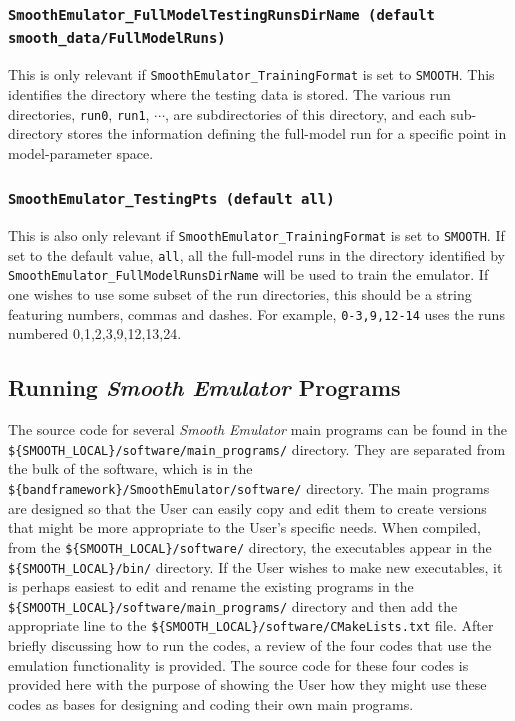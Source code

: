 \documentclass[UserManual.tex]{subfiles}
\begin{document}
\begin{sloppypar}
\subsubsection{{\tt SmoothEmulator\_FullModelTestingRunsDirName (default smooth\_data/FullModelRuns)}}
This is only relevant if {\tt SmoothEmulator\_TrainingFormat} is set to {\tt SMOOTH}. This identifies the directory where the testing data is stored. The various run directories, {\tt run0}, {\tt run1}, $\cdots$, are subdirectories of this directory, and each sub-directory stores the information defining the full-model run for a specific point in model-parameter space.

\subsubsection{{\tt SmoothEmulator\_TestingPts (default all)}}
This is also only relevant if {\tt SmoothEmulator\_TrainingFormat} is set to {\tt SMOOTH}. If set to the default value, {\tt all}, all the full-model runs in the directory identified by {\tt SmoothEmulator\_FullModelRunsDirName} will be used to train the emulator. If one wishes to use some subset of the run directories, this should be a string featuring numbers, commas and dashes. For example, {\tt 0-3,9,12-14} uses the runs numbered 0,1,2,3,9,12,13,24.

\subsection{Running {\it Smooth Emulator} Programs}

The source code for several {\it Smooth Emulator} main programs can be found in the \\{\tt \$\{SMOOTH\_LOCAL\}/software/main\_programs/} directory. They are separated from the bulk of the software, which is in the {\tt \$\{bandframework\}/SmoothEmulator/software/} directory. The main programs are designed so that the User can easily copy and edit them to create versions that might be more appropriate to the User's specific needs. When compiled, from the {\tt \$\{SMOOTH\_LOCAL\}/software/} directory, the executables appear in the {\tt \$\{SMOOTH\_LOCAL\}/bin/} directory. If the User wishes to make new executables, it is perhaps easiest to edit and rename the existing programs in the {\tt \$\{SMOOTH\_LOCAL\}/software/main\_programs/} directory and then add the appropriate line to the {\tt \$\{SMOOTH\_LOCAL\}/software/CMakeLists.txt} file. After briefly discussing how to run the codes, a review of the four codes that use the emulation functionality is provided. The source code for these four codes is provided here with the purpose of showing the User how they might use these codes as bases for designing and coding their own main programs.


\end{sloppypar}
\end{document}
